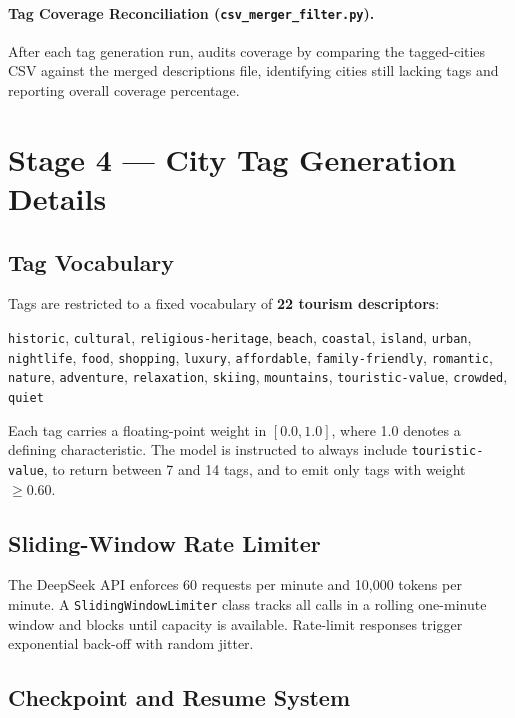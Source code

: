 \documentclass[12pt,a4paper]{report}
\begin{document}
\begin{appendices}
\paragraph{Tag Coverage Reconciliation (\texttt{csv\_merger\_filter.py}).}
After each tag generation run, audits coverage by comparing the tagged-cities CSV against the merged
descriptions file, identifying cities still lacking tags and reporting overall coverage percentage.

\section{Stage 4 — City Tag Generation Details}

\subsection{Tag Vocabulary}
\label{app:tag-vocabulary}

Tags are restricted to a fixed vocabulary of \textbf{22 tourism descriptors}:

\begin{center}
\small
\texttt{historic}, \texttt{cultural}, \texttt{religious-heritage}, \texttt{beach}, \texttt{coastal},
\texttt{island}, \texttt{urban}, \texttt{nightlife}, \texttt{food}, \texttt{shopping}, \texttt{luxury},
\texttt{affordable}, \texttt{family-friendly}, \texttt{romantic}, \texttt{nature}, \texttt{adventure},
\texttt{relaxation}, \texttt{skiing}, \texttt{mountains}, \texttt{touristic-value}, \texttt{crowded},
\texttt{quiet}
\end{center}

Each tag carries a floating-point weight in $[0.0, 1.0]$, where 1.0 denotes a defining
characteristic. The model is instructed to always include \texttt{touristic-value}, to return
between 7 and 14 tags, and to emit only tags with weight $\geq 0.60$.

\subsection{Sliding-Window Rate Limiter}

The DeepSeek API enforces 60 requests per minute and 10,000 tokens per minute. A
\texttt{SlidingWindowLimiter} class tracks all calls in a rolling one-minute window and blocks until
capacity is available. Rate-limit responses trigger exponential back-off with random jitter.

\subsection{Checkpoint and Resume System}


\end{appendices}
\end{document}
